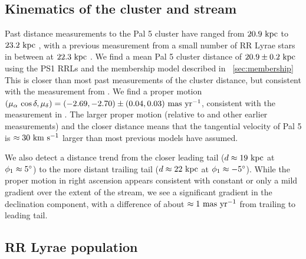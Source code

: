 \documentclass[twocolumn]{aastex63}
\begin{document}
\subsection{Kinematics of the cluster and stream}

Past distance measurements to the Pal 5 cluster have ranged from $20.9~\mathrm{kpc}$ \citep{Dotter:2011} to $23.2~\mathrm{kpc}$ \citep{Harris:1996}, with a previous measurement from a small number of RR Lyrae stars in between at $22.3~\mathrm{kpc}$ \citep{Vivas:2006}.
We find a mean Pal 5 cluster distance of $20.9 \pm 0.2~\mathrm{kpc}$ using the PS1 RRLs and the membership model described in \sectionname~\ref{sec:membership}
This is closer than most past measurements of the cluster distance, but consistent with the measurement from \citet{Dotter:2011}.
We find a proper motion $(\mu_\alpha\,\cos\delta, \mu_\delta) = (-2.69, -2.70) \pm (0.04, 0.03)~\mathrm{mas}~\mathrm{yr}^{-1}$, consistent with the measurement in \citet{Vasiliev:2019}.
The larger proper motion (relative to \citealt{Fritz:2015} and other earlier measurements) and the closer distance means that the tangential velocity of Pal 5 is $\approx 30~\mathrm{km}~\mathrm{s}^{-1}$ larger than most previous models have assumed.

We also detect a distance trend from the closer leading tail ($d \approx 19~\mathrm{kpc}$ at $\phi_1 \approx 5\mbox{$^\circ$}$) to the more distant trailing tail ($d \approx 22~\mathrm{kpc}$ at $\phi_1 \approx -5\mbox{$^\circ$}$).
While the proper motion in right ascension appears consistent with constant or only a mild gradient over the extent of the stream, we see a significant gradient in the declination component, with a difference of about $\approx 1~\mathrm{mas}~\mathrm{yr}^{-1}$ from trailing to leading tail.

\subsection{RR Lyrae population }

\end{document}
